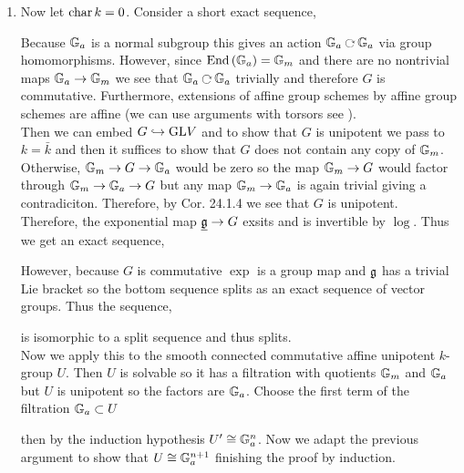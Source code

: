 \documentclass[12pt]{article}
\begin{document}
\begin{enumerate}
\item Now let $\operatorname{\mathrm{char}}{k} = 0$. Consider a short exact sequence,
\begin{center}
\end{center}
Because $\mathbb{G}_a$ is a normal subgroup this gives an action $\Ga \acts \Ga$ via group homomorphisms. However, since $\mathrm{End}\left( \mathbb{G}_a \right) = \mathbb{G}_m$ and there are no nontrivial maps $\mathbb{G}_a \to \mathbb{G}_m$ we see that $\Ga \acts \Ga$ trivially and therefore $G$ is commutative. Furthermore, extensions of affine group schemes by affine group schemes are affine (we can use arguments with torsors see ).
\bigskip\\
Then we can embed $G \hookrightarrow \mathrm{GL}{V}$ and to show that $G$ is unipotent we pass to $k = \bar{k}$ and then it suffices to show that $G$ does not contain any copy of $\mathbb{G}_m$. Otherwise, $\mathbb{G}_m \to G \to \mathbb{G}_a$ would be zero so the map $\mathbb{G}_m \to G$ would factor through $\mathbb{G}_m \to \mathbb{G}_a \to G$ but any map $\mathbb{G}_m \to \mathbb{G}_a$ is again trivial giving a contradiciton. Therefore, by Cor. 24.1.4 we see that $G$ is unipotent. Therefore, the exponential map $\underline{\mathfrak{g}} \to G$ exsits and is invertible by $\log$. Thus we get an exact sequence,
\begin{center}
\end{center}
However, because $G$ is commutative $\exp$ is a group map and $\mathfrak{g}$ has a trivial Lie bracket so the bottom sequence splits as an exact sequence of vector groups. Thus the sequence,
\begin{center}
\end{center}
is isomorphic to a split sequence and thus splits.
\bigskip\\
Now we apply this to the smooth connected commutative affine unipotent $k$-group $U$. Then $U$ is solvable so it has a filtration with quotients $\mathbb{G}_m$ and $\mathbb{G}_a$ but $U$ is unipotent so the factors are $\mathbb{G}_a$. Choose the first term of the filtration $\mathbb{G}_a \subset U$
\begin{center}
\end{center} 
then by the induction hypothesis $U' \cong \mathbb{G}_a^n$. Now we adapt the previous argument to show that $U \cong \mathbb{G}_a^{n+1}$ finishing the proof by induction.
\end{enumerate}
\end{document}
